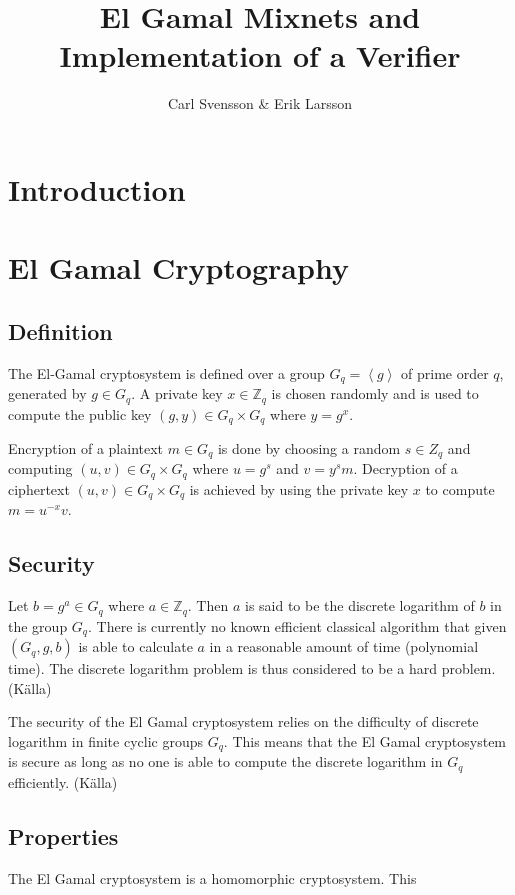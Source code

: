 \documentclass[10pt,a4paper]{article}
\author{Carl Svensson \& Erik Larsson}
\title{El Gamal Mixnets and Implementation of a Verifier}
\begin{document}
\maketitle
\tableofcontents

\setlength{\parindent}{0pt}
\setlength{\parskip}{10pt plus 1pt minus 1pt}

\pagebreak
\section{Introduction}


\section{El Gamal Cryptography}

\subsection{Definition}
The El-Gamal cryptosystem is defined over a group $G_q =
\left<g\right>$ of prime order $q$, generated by $g \in G_q$. A
private key $x \in \mathbb{Z}_q$ is chosen randomly and is used to
compute the public key $(g,y) \in G_q \times G_q$ where $y =
g^x$. 

Encryption of a plaintext $m \in G_q$ is done by choosing a random $s
\in Z_q$ and computing $(u,v) \in G_q \times G_q$ where $u = g^s$ and
$v = y^sm$. Decryption of a ciphertext $(u,v) \in G_q \times G_q$ is
achieved by using the private key $x$ to compute $m = u^{-x}v$.

\subsection{Security}
Let $b = g^a \in G_q$ where $a \in \mathbb{Z}_q$. Then $a$ is said to
be the discrete logarithm of $b$ in the group $G_q$. There is
currently no known efficient classical algorithm that given $(G_q, g,
b)$ is able to calculate $a$ in a reasonable amount of time
(polynomial time). The discrete logarithm problem is thus considered
to be a hard problem. (Källa)

The security of the El Gamal cryptosystem relies on the difficulty of
discrete logarithm in finite cyclic groups $G_q$. This means that the
El Gamal cryptosystem is secure as long as no one is able to compute
the discrete logarithm in $G_q$ efficiently. (Källa)

\subsection{Properties}
The El Gamal cryptosystem is a homomorphic cryptosystem. This 
\end{document}
